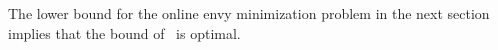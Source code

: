 The lower bound for the online envy minimization problem in the next section implies that the bound of~ is optimal.

    
    


    
